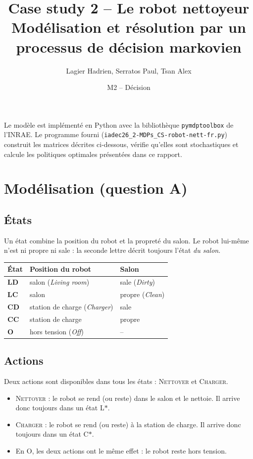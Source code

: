 \documentclass[11pt,a4paper]{article}
\title{Case study 2 -- Le robot nettoyeur\\[2pt]
\large Modélisation et résolution par un processus de décision markovien}
\author{Lagier Hadrien, Serratos Paul, Tsan Alex}
\date{M2 -- Décision}
\newcommand{\N}{\textsc{Nettoyer}}
\newcommand{\C}{\textsc{Charger}}
\begin{document}
\maketitle

\noindent Le modèle est implémenté en Python avec la bibliothèque \texttt{pymdptoolbox} de l'INRAE.
Le programme fourni (\texttt{iadec26\_2-MDPs\_CS-robot-nett-fr.py}) construit les matrices décrites
ci-dessous, vérifie qu'elles sont stochastiques et calcule les politiques optimales présentées dans ce rapport.

\section{Modélisation (question A)}

\subsection{États}

Un état combine la position du robot et la propreté du salon. Le robot lui-même n'est ni propre ni sale :
la seconde lettre décrit toujours l'état \emph{du salon}.

\begin{center}
\begin{tabular}{>{\bfseries}l l l}
\toprule
État & Position du robot & Salon \\
\midrule
LD & salon (\emph{Living room}) & sale (\emph{Dirty}) \\
LC & salon & propre (\emph{Clean}) \\
CD & station de charge (\emph{Charger}) & sale \\
CC & station de charge & propre \\
O  & hors tension (\emph{Off}) & -- \\
\bottomrule
\end{tabular}
\end{center}

\subsection{Actions}

Deux actions sont disponibles dans tous les états : \N{} et \C.
\begin{itemize}
  \item \N{} : le robot se rend (ou reste) dans le salon et le nettoie. Il arrive donc toujours dans un état L$\ast$.
  \item \C{} : le robot se rend (ou reste) à la station de charge. Il arrive donc toujours dans un état C$\ast$.
  \item En O, les deux actions ont le même effet : le robot reste hors tension.
\end{itemize}
\end{document}
